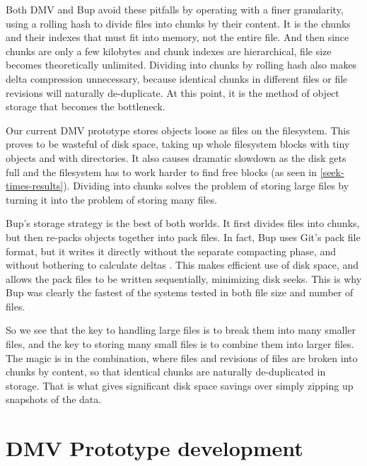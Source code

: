 Both DMV and Bup avoid these pitfalls by operating with a finer granularity,
using a rolling hash to divide files into chunks by their content. It is the
chunks and their indexes that must fit into memory, not the entire file. And
then since chunks are only a few kilobytes and chunk indexes are hierarchical,
file size becomes theoretically unlimited. Dividing into chunks by rolling hash
also makes delta compression unnecessary, because identical chunks in different
files or file revisions will naturally de-duplicate. At this point, it is the
method of object storage that becomes the bottleneck.

Our current DMV prototype stores objects loose as files on the filesystem. This
proves to be wasteful of disk space, taking up whole filesystem blocks with tiny
objects and with directories. It also causes dramatic slowdown as the disk gets
full and the filesystem has to work harder to find free blocks (as seen in
\autoref{seek-times-results}). Dividing into chunks solves the problem of
storing large files by turning it into the problem of storing many files.

Bup's storage strategy is the best of both worlds. It first divides files into
chunks, but then re-packs objects together into pack files. In fact, Bup uses
Git's pack file format\footnotemark, but it writes it directly without the
separate compacting phase, and without bothering to calculate deltas
\cite{bup_design}. This makes efficient use of disk space, and allows the pack
files to be written sequentially, minimizing disk seeks. This is why Bup was
clearly the fastest of the systems tested in both file size and number of files.


So we see that the key to handling large files is to break them into many
smaller files, and the key to storing many small files is to combine them into
larger files. The magic is in the combination, where files and revisions of
files are broken into chunks by content, so that identical chunks are naturally
de-duplicated in storage. That is what gives significant disk space savings over
simply zipping up snapshots of the data.

%



\section{DMV Prototype development}

